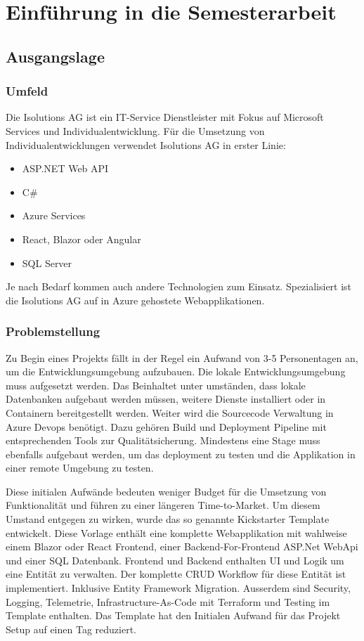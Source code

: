 \section{Einführung in die Semesterarbeit}
    \subsection{Ausgangslage}
        \subsubsection{Umfeld}
            Die Isolutions AG ist ein IT-Service Dienstleister mit Fokus auf Microsoft Services und Individualentwicklung. Für die Umsetzung von Individualentwicklungen verwendet Isolutions AG in erster Linie:
            \begin{itemize}
                \item ASP.NET Web API
                \item C\#
                \item Azure Services
                \item React, Blazor oder Angular
                \item SQL Server
            \end{itemize}
            Je nach Bedarf kommen auch andere Technologien zum Einsatz. Spezialisiert ist die Isolutions AG auf in Azure gehostete Webapplikationen.

        \subsubsection{Problemstellung}
            Zu Begin eines Projekts fällt in der Regel ein Aufwand von 3-5 Personentagen an, um die Entwicklungsumgebung aufzubauen. Die lokale Entwicklungsumgebung muss aufgesetzt werden. Das Beinhaltet unter umständen, dass lokale Datenbanken aufgebaut werden müssen, weitere Dienste installiert oder in Containern bereitgestellt werden.
            Weiter wird die Sourcecode Verwaltung in Azure Devops benötigt. Dazu gehören Build und Deployment Pipeline mit entsprechenden Tools zur Qualitätsicherung.
            Mindestens eine Stage muss ebenfalls aufgebaut werden, um das deployment zu testen und die Applikation in einer remote Umgebung zu testen.

            Diese initialen Aufwände bedeuten weniger Budget für die Umsetzung von Funktionalität und führen zu einer längeren Time-to-Market. Um diesem Umstand entgegen zu wirken, wurde das so genannte Kickstarter Template entwickelt. Diese Vorlage enthält eine komplette Webapplikation mit wahlweise einem Blazor oder React Frontend, einer Backend-For-Frontend ASP.Net WebApi und einer SQL Datenbank. Frontend und Backend enthalten UI und Logik um eine Entität zu verwalten. Der komplette CRUD Workflow für diese Entität ist implementiert. Inklusive Entity Framework Migration. Ausserdem sind Security, Logging, Telemetrie, Infrastructure-As-Code mit Terraform und Testing im Template enthalten. Das Template hat den Initialen Aufwand für das Projekt Setup auf einen Tag reduziert.

